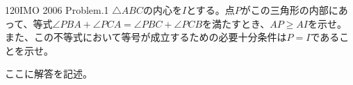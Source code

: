 \begin{thm}{120}{}{IMO 2006 Problem.1}
 $\triangle{ABC}$の内心を$I$とする。点$P$がこの三角形の内部にあって、等式$\angle{PBA}+\angle{PCA}=\angle{PBC}+\angle{PCB}$を満たすとき、$AP\ge AI$を示せ。また、この不等式において等号が成立するための必要十分条件は$P=I$であることを示せ。
\end{thm}

ここに解答を記述。